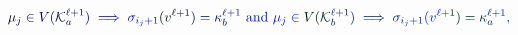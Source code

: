 \documentclass[12pt]{article}
\begin{document}
\makeatletter
\renewcommand*{\@textcolor}[3]{%
  \protect\leavevmode
  \begingroup
    \color#1{#2}#3%
  \endgroup
}
\makeatother
\begin{displaymath}
\mathcolor[RGB]{0,0,15}{\mu} _ { \mathcolor[RGB]{0,0,30}{j} } \mathcolor[RGB]{0,0,45}{\in} \mathcolor[RGB]{0,0,60}{V} \mathcolor[RGB]{0,0,75}{(} \mathcal { \mathcolor[RGB]{0,0,90}{K} } _ { \mathcolor[RGB]{0,0,105}{a} } ^ { \mathcolor[RGB]{0,0,120}{\ell} \mathcolor[RGB]{0,0,135}{+} \mathcolor[RGB]{0,0,150}{1} } \mathcolor[RGB]{0,0,165}{)} \mathcolor[RGB]{0,0,180}{\implies} \mathcolor[RGB]{0,0,195}{\sigma} _ { \mathcolor[RGB]{0,0,210}{i} _ { \mathcolor[RGB]{0,0,225}{j} } \mathcolor[RGB]{0,0,240}{+} \mathcolor[RGB]{0,0,255}{1} } \mathcolor[RGB]{0,15,0}{(} \mathcolor[RGB]{0,15,15}{v} ^ { \mathcolor[RGB]{0,15,30}{\ell} \mathcolor[RGB]{0,15,45}{+} \mathcolor[RGB]{0,15,60}{1} } \mathcolor[RGB]{0,15,75}{)} \mathcolor[RGB]{0,15,90}{=} \mathcolor[RGB]{0,15,105}{\kappa} _ { \mathcolor[RGB]{0,15,120}{b} } ^ { \mathcolor[RGB]{0,15,135}{\ell} \mathcolor[RGB]{0,15,150}{+} \mathcolor[RGB]{0,15,165}{1} } \mathrm { ~ \mathcolor[RGB]{0,15,180}{a} \mathcolor[RGB]{0,15,195}{n} \mathcolor[RGB]{0,15,210}{d} ~ } \mathcolor[RGB]{0,15,225}{\mu} _ { \mathcolor[RGB]{0,15,240}{j} } \mathcolor[RGB]{0,15,255}{\in} \mathcolor[RGB]{0,30,0}{V} \mathcolor[RGB]{0,30,15}{(} \mathcal { \mathcolor[RGB]{0,30,30}{K} } _ { \mathcolor[RGB]{0,30,45}{b} } ^ { \mathcolor[RGB]{0,30,60}{\ell} \mathcolor[RGB]{0,30,75}{+} \mathcolor[RGB]{0,30,90}{1} } \mathcolor[RGB]{0,30,105}{)} \mathcolor[RGB]{0,30,120}{\implies} \mathcolor[RGB]{0,30,135}{\sigma} _ { \mathcolor[RGB]{0,30,150}{i} _ { \mathcolor[RGB]{0,30,165}{j} } \mathcolor[RGB]{0,30,180}{+} \mathcolor[RGB]{0,30,195}{1} } \mathcolor[RGB]{0,30,210}{(} \mathcolor[RGB]{0,30,225}{v} ^ { \mathcolor[RGB]{0,30,240}{\ell} \mathcolor[RGB]{0,30,255}{+} \mathcolor[RGB]{0,45,0}{1} } \mathcolor[RGB]{0,45,15}{)} \mathcolor[RGB]{0,45,30}{=} \mathcolor[RGB]{0,45,45}{\kappa} _ { \mathcolor[RGB]{0,45,60}{a} } ^ { \mathcolor[RGB]{0,45,75}{\ell} \mathcolor[RGB]{0,45,90}{+} \mathcolor[RGB]{0,45,105}{1} } \mathcolor[RGB]{0,45,120}{,}
\end{displaymath}
\end{document}
